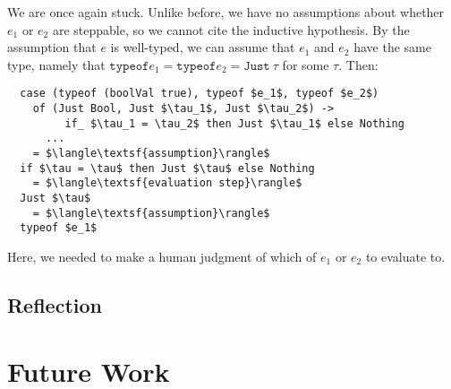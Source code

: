 \documentclass[manuscript,screen,review,sigplan]{acmart}
\begin{document}
We are once again stuck. Unlike before, we have no assumptions about whether
$e_1$ or $e_2$ are steppable, so we cannot cite the inductive hypothesis. By
the assumption that $e$ is well-typed, we can assume that $e_1$ and $e_2$ have
the same type, namely that $\texttt{typeof} e_1 = \texttt{typeof} e_2 =
\texttt{Just}\ \tau$ for some $\tau$. Then:

\begin{lstlisting}
  case (typeof (boolVal true), typeof $e_1$, typeof $e_2$)
    of (Just Bool, Just $\tau_1$, Just $\tau_2$) ->
         if_ $\tau_1 = \tau_2$ then Just $\tau_1$ else Nothing
      ...
    = $\langle\textsf{assumption}\rangle$
  if $\tau = \tau$ then Just $\tau$ else Nothing
    = $\langle\textsf{evaluation step}\rangle$
  Just $\tau$
    = $\langle\textsf{assumption}\rangle$
  typeof $e_1$
\end{lstlisting}

Here, we needed to make a human judgment of which of $e_1$ or $e_2$ to evaluate
to.

\subsection{Reflection}

\section{Future Work}



\end{document}
